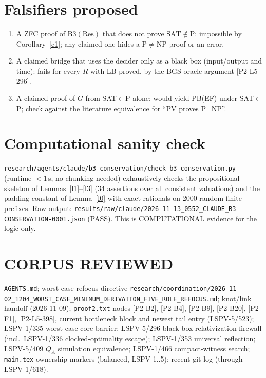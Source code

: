 \documentclass[11pt]{article}
\theoremstyle{definition}
\begin{document}
\section{Falsifiers proposed}
\begin{enumerate}
\item A ZFC proof of $\mathrm{B3}(\mathrm{Res})$ that does not prove $\mathrm{SAT}\notin\mathrm P$: impossible by Corollary~\ref{c1}; any claimed one hides a P$\ne$NP proof or an error.
\item A claimed bridge that uses the decider only as a black box (input/output and time): fails for every $R$ with LB proved, by the BGS oracle argument [P2-L5-296].
\item A claimed proof of $G$ from SAT$\in$P alone: would yield PB(EF) under SAT$\in$P; check against the literature equivalence for ``PV proves P=NP''.
\end{enumerate}

\section{Computational sanity check}
\texttt{research/agents/claude/b3-conservation/check\_b3\_conservation.py} (runtime
$<1$\,s, no chunking needed) exhaustively checks the propositional skeleton of
Lemmas~\ref{l1}--\ref{l3} (34 assertions over all consistent valuations) and the
padding constant of Lemma~\ref{l0} with exact rationals on 2000 random finite prefixes.
Raw output: \texttt{results/raw/claude/2026-11-13\_0552\_CLAUDE\_B3-CONSERVATION-0001.json}
(PASS). This is COMPUTATIONAL evidence for the logic only.

\section{CORPUS REVIEWED}
\texttt{AGENTS.md}; worst-case refocus directive
\texttt{research/coordination/2026-11-02\_1204\_WORST\_CASE\_MINIMUM\_DERIVATION\_FIVE\_ROLE\_REFOCUS.md};
knot/link handoff (2026-11-09); \texttt{proof2.txt} nodes [P2-B2], [P2-B4], [P2-B9],
[P2-B20], [P2-F1], [P2-L5-398], current bottleneck block and newest tail entry (LSPV-5/523);
LSPV-1/335 worst-case core barrier; LSPV-5/296 black-box relativization firewall
(incl.\ LSPV-1/336 clocked-optimality escape); LSPV-1/353 universal reflection;
LSPV-5/409 $Q_A$ simulation equivalence; LSPV-1/466 compact-witness search;
\texttt{main.tex} ownership markers (balanced, LSPV-1..5); recent git log (through LSPV-1/618).
\end{document}

